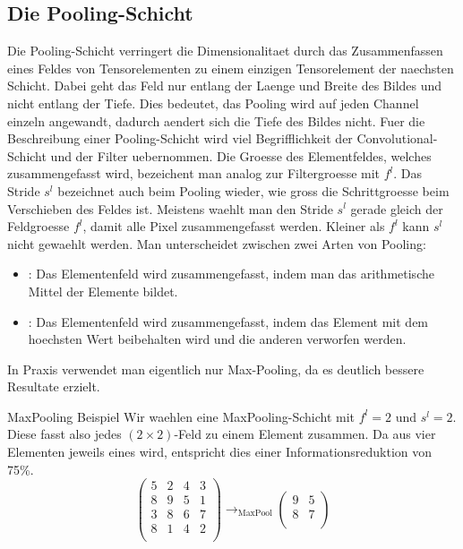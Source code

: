 \subsection{Die Pooling-Schicht}
Die Pooling-Schicht verringert die Dimensionalitaet durch das Zusammenfassen eines Feldes
von Tensorelementen zu einem einzigen Tensorelement der naechsten Schicht.
Dabei geht das Feld nur entlang der Laenge und Breite des Bildes und
nicht entlang der Tiefe. Dies bedeutet, das Pooling wird auf jeden Channel
einzeln angewandt, dadurch aendert sich die Tiefe des Bildes nicht.
\para{}
Fuer die Beschreibung einer Pooling-Schicht wird viel Begrifflichkeit der
Convolutional-Schicht und der Filter uebernommen.
Die Groesse des Elementfeldes, welches zusammengefasst wird, bezeichent man analog zur
Filtergroesse mit $f^l$. Das Stride $s^l$ bezeichnet auch beim Pooling wieder, wie
gross die Schrittgroesse beim Verschieben des Feldes ist. Meistens waehlt man den
Stride $s^l$ gerade gleich der Feldgroesse $f^l$, damit alle Pixel
zusammengefasst werden. Kleiner als $f^l$ kann $s^l$ nicht gewaehlt werden.
\para{}
Man unterscheidet zwischen zwei Arten von Pooling:
\begin{itemize}
\item{: Das Elementenfeld wird zusammengefasst, indem
    man das arithmetische Mittel der Elemente bildet.}
\item{: Das Elementenfeld wird zusammengefasst, indem das
    Element mit dem hoechsten Wert beibehalten wird und die anderen verworfen werden.}
\end{itemize}
In Praxis verwendet man eigentlich nur Max-Pooling, da es deutlich bessere
Resultate erzielt.
\begin{examplebox}{MaxPooling Beispiel}
  Wir waehlen eine MaxPooling-Schicht mit $f^l = 2$ und $s^l = 2$.
  Diese fasst also jedes $(2 \times 2)$-Feld zu einem Element zusammen. Da aus
  vier Elementen jeweils eines wird, entspricht dies einer Informationsreduktion
  von 75\%.
  \para{}
  \begin{equation*}
    \begin{pmatrix}
      5 & 2 & 4 & 3 \\
      8 & 9 & 5 & 1 \\
      3 & 8 & 6 & 7 \\
      8 & 1 & 4 & 2 \\
    \end{pmatrix}
    \to_{\text{MaxPool}}
    \begin{pmatrix}
      9 & 5 \\
      8 & 7 \\
    \end{pmatrix}
  \end{equation*}
\end{examplebox}

